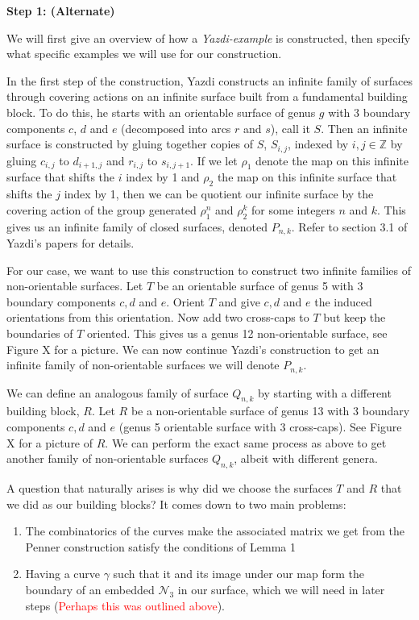 \textbf{Step 1: (Alternate)}

We will first give an overview of how a \textit{Yazdi-example} is constructed, then specify what specific examples we will use for our construction.

In the first step of the construction, Yazdi constructs an infinite family of surfaces through covering actions on an infinite surface built from a fundamental building block. To do this, he starts with an orientable surface of genus $g$ with 3 boundary components $c$, $d$ and $e$ (decomposed into arcs $r$ and $s$), call it $S$. Then an infinite surface is constructed by gluing together copies of $S$, $S_{i,j}$, indexed by $i,j \in \mathbb{Z}$ by gluing $c_{i,j}$ to $d_{i+1,j}$ and $r_{i,j}$ to $s_{i,j+1}$. If we let $\rho_1$ denote the map on this infinite surface that shifts the $i$ index by 1
and $\rho_2$ the map on this infinite surface that shifts the $j$ index by 1, then we can be quotient our infinite surface by the covering action of the group generated $\rho_1^n$ and $\rho_2^k$ for some integers $n$ and $k$. This gives us an infinite family of closed surfaces, denoted $P_{n,k}$. Refer to section 3.1 of Yazdi's papers for details.

For our case, we want to use this construction to construct two infinite families of non-orientable surfaces. Let $T$ be an orientable surface of genus 5 with 3 boundary components $c,d$ and $e$. Orient $T$ and give $c,d$ and $e$ the induced orientations from this orientation. Now add two cross-caps to $T$ but keep the boundaries of $T$ oriented. This gives us a genus 12 non-orientable surface, see Figure X for a picture. We can now continue Yazdi's construction to get an infinite family of non-orientable surfaces we will denote $P_{n,k}$.

We can define an analogous family of surface $Q_{n,k}$ by starting with a different building block, $R$. Let $R$ be a non-orientable surface of genus 13 with 3 boundary components $c,d$ and $e$ (genus 5 orientable surface with 3 cross-caps). See Figure X for a picture of $R$. We can perform the exact same process as above to get another family of non-orientable surfaces $Q_{n,k}$, albeit with different genera. 

A question that naturally arises is why did we choose the surfaces $T$ and $R$ that we did as our building blocks? It comes down to two main problems:
\begin{enumerate}
    \item The combinatorics of the curves make the associated matrix we get from the Penner construction satisfy the conditions of Lemma 1 
    \item Having a curve $\gamma$ such that it and its image under our map form the boundary of an embedded $\mathcal{N}_3$ in our surface, which we will need in later steps (\textcolor{red}{Perhaps this was outlined above}). 
\end{enumerate}

